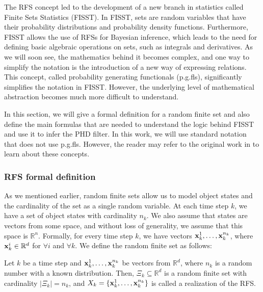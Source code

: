 The RFS concept led to the development of a new branch in statistics called Finite Sets Statistics (FISST). In FISST, sets are random variables that have their probability distributions and probability density functions. Furthermore, FISST allows the use of RFSs for Bayesian inference, which leads to the need for defining basic algebraic operations on sets, such as integrals and derivatives. As we will soon see, the mathematics behind it becomes complex, and one way to simplify the notation is the introduction of a new way of expressing relations. This concept, called probability generating functionals (p.g.fls), significantly simplifies the notation in FISST. However, the underlying level of mathematical abstraction becomes much more difficult to understand.

In this section, we will give a formal definition for a random finite set and also define the main formulas that are needed to understand the logic behind FISST and use it to infer the PHD filter. In this work, we will use standard notation that does not use p.g.fls. However, the reader may refer to the original work in \cite{mahlerMultitargetBayesFiltering2003} to learn about these concepts.

\subsubsection{RFS formal definition}\label{sec:rfs-definition}

As we mentioned earlier, random finite sets allow us to model object states and the cardinality of the set as a single random variable. At each time step $k$, we have a set of object states with cardinality $n_k$. We also assume that states are vectors from some space, and without loss of generality, we assume that this space is $\mathbb{R}^n$. Formally, for every time step $k$, we have vectors ${\vecat{x}{k}^{1}, \ldots, \vecat{x}{k}^{n_k}}$, where $\vecat{x}{k}^{i} \in \mathbb{R}^d$ for $\forall i$ and $\forall k$. We define the random finite set as follows:

\begin{definition}
    Let $k$ be a time step and ${\vecat{x}{k}^{1}, \ldots, \vecat{x}{k}^{n_k}}$ be vectors from $\mathbb{R}^d$, where $n_k$ is a random number with a known distribution. Then, $\Xi_k \subseteq \mathbb{R}^d$ is a random finite set with cardinality $|\Xi_k| = n_k$, and $X_k = \{\vecat{x}{k}^{1}, \ldots, \vecat{x}{k}^{n_k}\}$ is called a realization of the RFS.
\end{definition}


